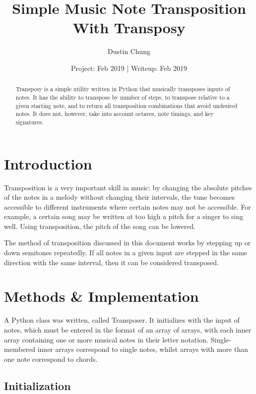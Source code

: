 \documentclass[11pt, a4paper]{article}
\begin{document}
	\title{Simple Music Note Transposition With Transposy}
	\author{Dustin Chung}
	\date{Project: Feb 2019 | Writeup: Feb 2019}
	\maketitle
	\begin{abstract}
		Transposy is a simple utility written in Python that musically transposes inputs of notes. It has the ability to transpose by number of steps, to transpose relative to a given starting note, and to return all transposition combinations that avoid undesired notes. It does not, however, take into account octaves, note timings, and key signatures.
	\end{abstract}

	\section{Introduction}
		Transposition is a very important skill in music: by changing the absolute pitches of the notes in a melody without changing their intervals, the tune becomes accessible to different instruments where certain notes may not be accessible. For example, a certain song may be written at too high a pitch for a singer to sing well. Using transposition, the pitch of the song can be lowered. 

		The method of transposition discussed in this document works by stepping up or down semitones repeatedly. If all notes in a given input are stepped in the same direction with the same interval, then it can be considered transposed.

	\section{Methods \& Implementation}
		A Python class was written, called Transposer. It initializes with the input of notes, which must be entered in the format of an array of arrays, with each inner array containing one or more musical notes in their letter notation. Single-membered inner arrays correspond to single notes, whilst arrays with more than one note correspond to chords.

		\subsection{Initialization}
\end{document}
